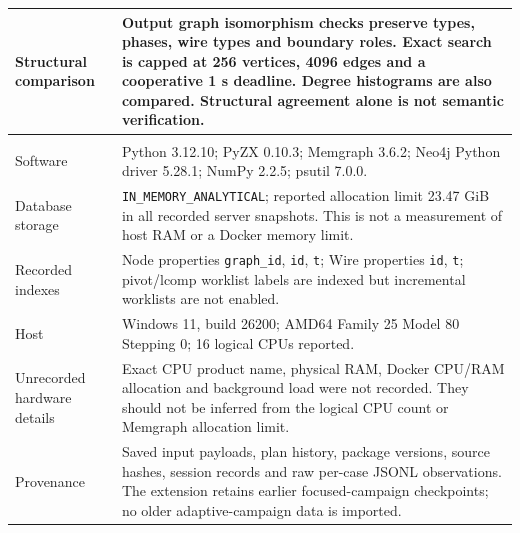 \begin{longtable}{@{}>{\raggedright\arraybackslash}p{}>{\raggedright\arraybackslash}p{}@{}}
Structural comparison & Output graph isomorphism checks preserve types, phases, wire types and boundary roles. Exact search is capped at 256 vertices, 4096 edges and a cooperative 1 s deadline. Degree histograms are also compared. Structural agreement alone is not semantic verification. \\
\hline
\multicolumn{2}{l}{\textbf{Recorded software and host}} \\
Software & Python 3.12.10; PyZX 0.10.3; Memgraph 3.6.2; Neo4j Python driver 5.28.1; NumPy 2.2.5; psutil 7.0.0. \\
Database storage & \texttt{IN\_MEMORY\_ANALYTICAL}; reported allocation limit 23.47 GiB in all recorded server snapshots. This is not a measurement of host RAM or a Docker memory limit. \\
Recorded indexes & Node properties \texttt{graph\_id}, \texttt{id}, \texttt{t}; Wire properties \texttt{id}, \texttt{t}; pivot/lcomp worklist labels are indexed but incremental worklists are not enabled. \\
Host & Windows 11, build 26200; AMD64 Family 25 Model 80 Stepping 0; 16 logical CPUs reported. \\
Unrecorded hardware details & Exact CPU product name, physical RAM, Docker CPU/RAM allocation and background load were not recorded. They should not be inferred from the logical CPU count or Memgraph allocation limit. \\
Provenance & Saved input payloads, plan history, package versions, source hashes, session records and raw per-case JSONL observations. The extension retains earlier focused-campaign checkpoints; no older adaptive-campaign data is imported. \\
\end{longtable}
